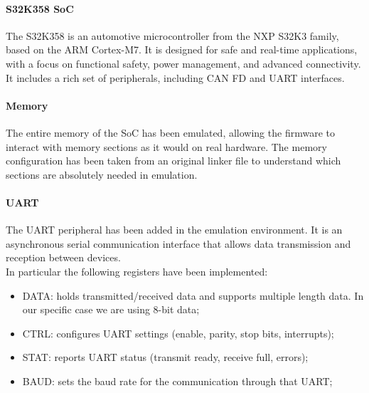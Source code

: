 \paragraph{S32K358 SoC}
The S32K358 is an automotive microcontroller from the NXP S32K3 family, based on the ARM Cortex-M7. It is designed for safe and real-time applications, with a focus on functional safety, power management, and advanced connectivity. It includes a rich set of peripherals, including CAN FD and UART interfaces.

\paragraph{Memory}
The entire memory of the SoC has been emulated, allowing the firmware to interact with memory sections as it would on real hardware. The memory configuration has been taken from an original linker file to understand which sections are absolutely needed in emulation.

\paragraph{UART}
The UART peripheral has been added in the emulation environment. It is an asynchronous serial communication interface that allows data transmission and reception between devices.\\
In particular the following registers have been implemented:
\begin{itemize}
    \item DATA: holds transmitted/received data and supports multiple length data. In our specific case we are using 8-bit data;
    \item CTRL: configures UART settings (enable, parity, stop bits, interrupts);
    \item STAT: reports UART status (transmit ready, receive full, errors);
    \item BAUD: sets the baud rate for the communication through that UART;
\end{itemize}

